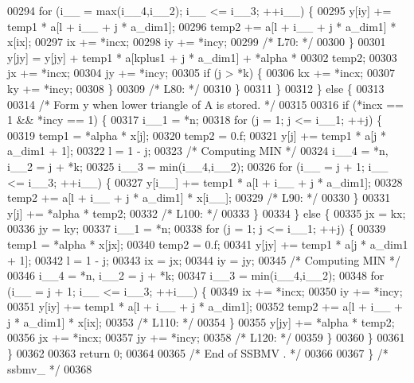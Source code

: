 \begin{DoxyCode}
00294         \textcolor{keywordflow}{for} (i\_\_ = max(i\_\_4,i\_\_2); i\_\_ <= i\_\_3; ++i\_\_) \{
00295             y[iy] += temp1 * a[l + i\_\_ + j * a\_dim1];
00296             temp2 += a[l + i\_\_ + j * a\_dim1] * x[ix];
00297             ix += *incx;
00298             iy += *incy;
00299 \textcolor{comment}{/* L70: */}
00300         \}
00301         y[jy] = y[jy] + temp1 * a[kplus1 + j * a\_dim1] + *alpha * 
00302             temp2;
00303         jx += *incx;
00304         jy += *incy;
00305         \textcolor{keywordflow}{if} (j > *k) \{
00306             kx += *incx;
00307             ky += *incy;
00308         \}
00309 \textcolor{comment}{/* L80: */}
00310         \}
00311     \}
00312     \} \textcolor{keywordflow}{else} \{
00313 
00314 \textcolor{comment}{/*        Form  y  when lower triangle of A is stored. */}
00315 
00316     \textcolor{keywordflow}{if} (*incx == 1 && *incy == 1) \{
00317         i\_\_1 = *n;
00318         \textcolor{keywordflow}{for} (j = 1; j <= i\_\_1; ++j) \{
00319         temp1 = *alpha * x[j];
00320         temp2 = 0.f;
00321         y[j] += temp1 * a[j * a\_dim1 + 1];
00322         l = 1 - j;
00323 \textcolor{comment}{/* Computing MIN */}
00324         i\_\_4 = *n, i\_\_2 = j + *k;
00325         i\_\_3 = min(i\_\_4,i\_\_2);
00326         \textcolor{keywordflow}{for} (i\_\_ = j + 1; i\_\_ <= i\_\_3; ++i\_\_) \{
00327             y[i\_\_] += temp1 * a[l + i\_\_ + j * a\_dim1];
00328             temp2 += a[l + i\_\_ + j * a\_dim1] * x[i\_\_];
00329 \textcolor{comment}{/* L90: */}
00330         \}
00331         y[j] += *alpha * temp2;
00332 \textcolor{comment}{/* L100: */}
00333         \}
00334     \} \textcolor{keywordflow}{else} \{
00335         jx = kx;
00336         jy = ky;
00337         i\_\_1 = *n;
00338         \textcolor{keywordflow}{for} (j = 1; j <= i\_\_1; ++j) \{
00339         temp1 = *alpha * x[jx];
00340         temp2 = 0.f;
00341         y[jy] += temp1 * a[j * a\_dim1 + 1];
00342         l = 1 - j;
00343         ix = jx;
00344         iy = jy;
00345 \textcolor{comment}{/* Computing MIN */}
00346         i\_\_4 = *n, i\_\_2 = j + *k;
00347         i\_\_3 = min(i\_\_4,i\_\_2);
00348         \textcolor{keywordflow}{for} (i\_\_ = j + 1; i\_\_ <= i\_\_3; ++i\_\_) \{
00349             ix += *incx;
00350             iy += *incy;
00351             y[iy] += temp1 * a[l + i\_\_ + j * a\_dim1];
00352             temp2 += a[l + i\_\_ + j * a\_dim1] * x[ix];
00353 \textcolor{comment}{/* L110: */}
00354         \}
00355         y[jy] += *alpha * temp2;
00356         jx += *incx;
00357         jy += *incy;
00358 \textcolor{comment}{/* L120: */}
00359         \}
00360     \}
00361     \}
00362 
00363     \textcolor{keywordflow}{return} 0;
00364 
00365 \textcolor{comment}{/*     End of SSBMV . */}
00366 
00367 \} \textcolor{comment}{/* ssbmv\_ */}
00368 
\end{DoxyCode}
